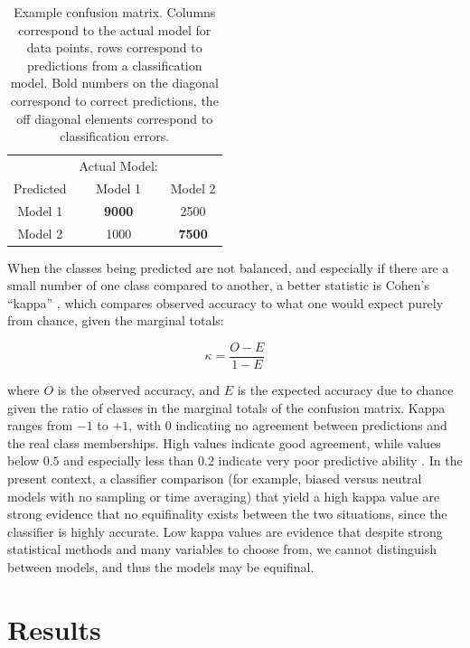 \begin{table}[ht]
\begin{tabular}{c|cc}
 & Actual Model: & \\
 Predicted &  Model 1 & Model  2 \\
  \hline
 Model  1 & \textbf{9000} & 2500 \\
   Model  2 & 1000 & \textbf{7500} \\
\end{tabular}
    \caption{Example confusion matrix.  Columns correspond to the actual model for data points, rows correspond to predictions from a classification model.  Bold numbers on the diagonal correspond to correct predictions, the off diagonal elements correspond to classification errors.}
    \label{tab:confusion-matrix}
\end{table}


When the classes
being predicted are not balanced, and especially if there are a small
number of one class compared to another, a better statistic is Cohen's
``kappa'' \citep{kuhn2013applied}, which compares observed accuracy to
what one would expect purely from chance, given the marginal totals:

\begin{equation}
\kappa = \frac{O - E}{1 - E}
\label{eq:kappa}
\end{equation}

where \(O\) is the observed accuracy, and \(E\) is the expected accuracy
due to chance given the ratio of classes in the marginal totals of the
confusion matrix. Kappa ranges from \(-1\) to \(+1\), with \(0\)
indicating no agreement between predictions and the real class
memberships. High values indicate good agreement, while values below
\(0.5\) and especially less than \(0.2\) indicate very poor predictive
ability \citep{altman1991practical}. In the present context, a
classifier comparison (for example, biased versus neutral models with no
sampling or time averaging) that yield a high kappa value are strong
evidence that no equifinality exists between the two situations, since
the classifier is highly accurate. Low kappa values are evidence that
despite strong statistical methods and many variables to choose from, we
cannot distinguish between models, and thus the models may be equifinal.  

\section{Results}\label{results}

